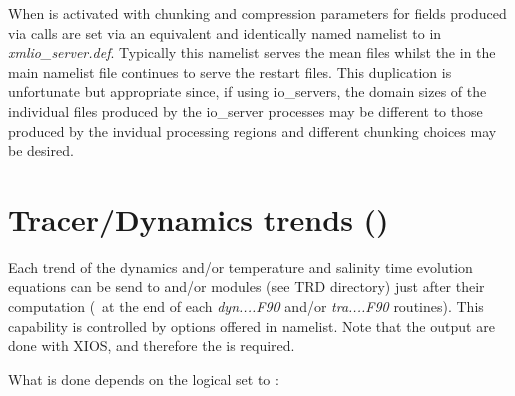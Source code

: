 \documentclass[../main/NEMO_manual]{subfiles}
\begin{document}
When  is activated with  chunking and compression parameters for fields produced via
 calls are set via an equivalent and identically named namelist to  in
\textit{xmlio\_server.def}.
Typically this namelist serves the mean files whilst the  in the main namelist file continues to
serve the restart files.
This duplication is unfortunate but appropriate since, if using io\_servers, the domain sizes of
the individual files produced by the io\_server processes may be different to those produced by
the invidual processing regions and different chunking choices may be desired.

\section[Tracer/Dynamics trends (\forcode{&namtrd})]{Tracer/Dynamics trends (\protect{})}
\label{sec:DIA_trd}

\begin{listing}
  \caption{}
  \label{lst:namtrd}
\end{listing}

Each trend of the dynamics and/or temperature and salinity time evolution equations can be send to
 and/or  modules (see TRD directory) just after their computation
(\ie\ at the end of each \textit{dyn....F90} and/or \textit{tra....F90} routines).
This capability is controlled by options offered in  namelist.
Note that the output are done with XIOS, and therefore the  is required.

What is done depends on the  logical set to :
\end{document}
